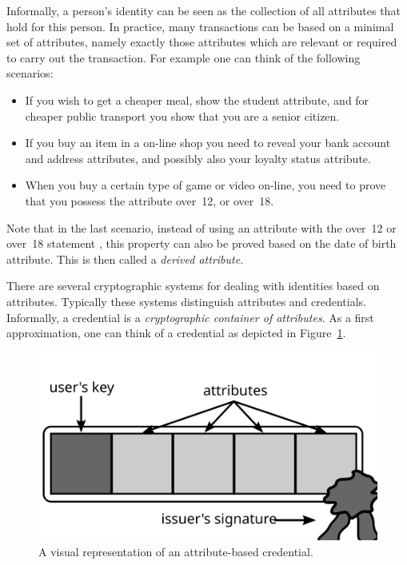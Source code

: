 Informally, a person's identity can be seen as the collection
of all attributes that hold for this person. In practice, many
transactions can be based on a minimal set of attributes, namely exactly those
attributes which are relevant or required to carry out the transaction. For
example one can think of the following scenarios:
\begin{itemize}
  \item If you wish to get a cheaper meal, show the \textsf{student} attribute,
    and for cheaper public transport you show that you are a \textsf{senior
    citizen}.
  \item If you buy an item in a on-line shop you need to reveal your
    \textsf{bank account} and \textsf{address} attributes, and possibly also
    your \textsf{loyalty status} attribute.
  \item When you buy a certain type of game or video on-line, you need to
    prove that you possess the attribute \textsf{over~12}, or \textsf{over~18}.
\end{itemize}
Note that in the last scenario, instead of using an attribute with the
\textsf{over~12} or \textsf{over~18} statement
, this property can also be proved
based on the \textsf{date of birth} attribute. This is then called a
\emph{derived attribute}.

There are several cryptographic systems for dealing with identities
 based on attributes. Typically these systems
distinguish attributes and credentials. Informally, a credential
 is a \emph{cryptographic container  of attributes}. As a first approximation, one can think of a
credential as depicted in Figure~\ref{fig:Credential}.

\begin{figure}[ht]
  \centering
  \includegraphics[scale=.5]{images/credential}
  \caption{A visual representation of an attribute-based credential.}
  \label{fig:Credential}
\end{figure}

